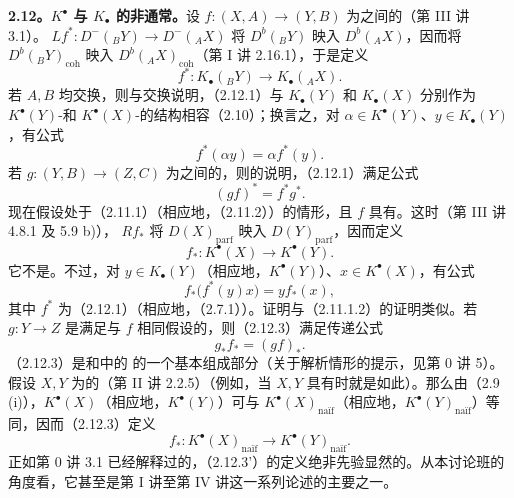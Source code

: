 \textbf{2.12。$K^\bullet$ 与 $K_\bullet$ 的非通常。}设 $f:(X,A)\to(Y,B)$ 为之间的（第 III 讲 3.1）。 $Lf^*:D^-({}_BY)\to D^-({}_AX)$ 将 $D^b({}_BY)$ 映入 $D^b({}_AX)$，因而将 $D^b({}_BY)_{\mathrm{coh}}$ 映入 $D^b({}_AX)_{\mathrm{coh}}$（第 I 讲 2.16.1），于是定义
\[f^*:K_\bullet({}_BY)\longrightarrow K_\bullet({}_AX).\tag{2.12.1}\]
若 $A,B$ 均交换，则与交换说明，（2.12.1）与 $K_\bullet(Y)$ 和 $K_\bullet(X)$ 分别作为 $K^\bullet(Y)$-和 $K^\bullet(X)$-的结构相容（2.10）；换言之，对 $\alpha\in K^\bullet(Y)$、$y\in K_\bullet(Y)$，有公式
\[f^*(\alpha y)=\alpha f^*(y).\tag{2.12.2}\]
若 $g:(Y,B)\to(Z,C)$ 为之间的，则的说明，（2.12.1）满足公式
\[(gf)^*=f^*g^*.\tag{2.12.1.1}\]
现在假设处于（2.11.1）（相应地，（2.11.2））的情形，且 $f$ 具有。这时（第 III 讲 4.8.1 及 5.9 b)）， $Rf_*$ 将 $D(X)_{\mathrm{parf}}$ 映入 $D(Y)_{\mathrm{parf}}$，因而定义
\[f_*:K^\bullet(X)\longrightarrow K^\bullet(Y).\tag{2.12.3}\]
它不是。不过，对 $y\in K_\bullet(Y)$（相应地，$K^\bullet(Y)$）、$x\in K^\bullet(X)$，有公式
\[f_*\bigl(f^*(y)x\bigr)=y f_*(x),\tag{2.12.4}\]
其中 $f^*$ 为（2.12.1）（相应地，（2.7.1））。证明与（2.11.1.2）的证明类似。若 $g:Y\to Z$ 是满足与 $f$ 相同假设的，则（2.12.3）满足传递公式
\[g_*f_*=(gf)_*.\tag{2.12.3.1}\]
（2.12.3）是和中的 的一个基本组成部分（关于解析情形的提示，见第 0 讲 5）。假设 $X,Y$ 为的（第 II 讲 2.2.5）（例如，当 $X,Y$ 具有时就是如此）。那么由（2.9 (i)），$K^\bullet(X)$（相应地，$K^\bullet(Y)$）可与 $K^\bullet(X)_{\text{naïf}}$（相应地，$K^\bullet(Y)_{\text{naïf}}$）等同，因而（2.12.3）定义
\[f_*:K^\bullet(X)_{\text{naïf}}\longrightarrow K^\bullet(Y)_{\text{naïf}}.\tag{2.12.3'}\]
正如第 0 讲 3.1 已经解释过的，（2.12.3'）的定义绝非先验显然的。从本讨论班的角度看，它甚至是第 I 讲至第 IV 讲这一系列论述的主要之一。

